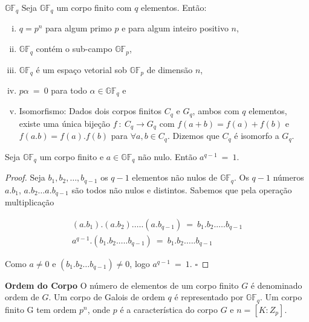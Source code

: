 \begin{theorem} {\bf $\mathbb{GF}_q$} \label{GFq}  Seja $\mathbb{GF}_q$ um corpo finito com $q$ elementos. Então:
   \begin{enumerate}[(i)]
     \item $q = p^n$ para algum primo $p$ e para algum inteiro positivo $n$,
     \item $\mathbb{GF}_q$ contém o sub-campo $\mathbb{GF}_p$,
     \item $\mathbb{GF}_q$ é um espaço vetorial sob $\mathbb{GF}_p$ de dimensão $n$,
     \item $p\alpha\ =\ 0$ para todo $\alpha \in \mathbb{GF}_q$ e
     \item Isomorfismo:  Dados dois corpos finitos $C_q$ e $G_q$, ambos com $q$ elementos, existe uma única bijeção $f\ :\ C_q \rightarrow G_q$ com $f(a+b)=f(a)+f(b)$ e $f(a.b)=f(a).f(b)$ para $\forall a,b \in C_q$. Dizemos que  $C_q$ é isomorfo a $G_q$.
   \end{enumerate}
\end{theorem}


\begin{theorem} \label{teorema1} Seja $\mathbb{GF}_q$ um corpo finito e $a \in \mathbb{GF}_q$ não nulo. Então $a^{q-1}\ =\ 1$.
\end{theorem}

\begin{proof} Seja $b_1, b_2, \ldots , b_{q-1}$ os $q-1$ elementos não nulos de $\mathbb{GF}_q$. Os $q-1$ números  $a.b_1$, $a.b_2 \ldots  a.b_{q-1}$ são todos não nulos e distintos. Sabemos que pela operação multiplicação

$$
\begin{array}{cl}
(a.b_1).(a.b_2). \ldots  .(a.b_{q-1})\ =\ b_1.b_2. \ldots  .b_{q-1}\\
a^{q-1}.(b_1.b_2. \ldots  .b_{q-1})\ =\ b_1.b_2. \ldots  .b_{q-1}
\end{array}
$$

Como $a \neq 0$ e $(b_1.b_2 \ldots  b_{q-1}) \neq 0$, logo $a^{q-1}\ =\ 1$. $\square$
\end{proof}


\begin{definition} {\bf Ordem do Corpo} \label{OrdCorpo}  O número de elementos de um corpo finito $G$ é denominado ordem de $G$. Um corpo de Galois de ordem $q$ é representado por $\mathbb{GF}_q$. Um corpo finito G tem ordem $p^n$, onde $p$ é a característica do corpo $G$ e $n = [K: Z_p]$.
\end{definition}

